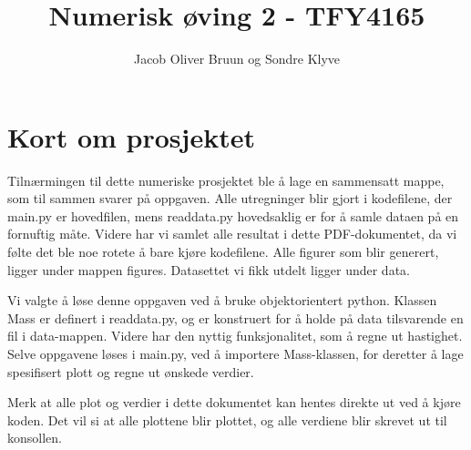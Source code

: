 \documentclass[a4paper, 11pt]{article}
\title{Numerisk øving 2 - TFY4165}
\author{Jacob Oliver Bruun og Sondre Klyve}
\begin{document}
\maketitle
\section*{Kort om prosjektet}
Tilnærmingen til dette numeriske prosjektet ble å lage en sammensatt mappe, som til sammen svarer på oppgaven. Alle utregninger blir gjort i kodefilene, der main.py er hovedfilen, mens read\textunderscore data.py hovedsaklig er for å samle dataen på en fornuftig måte. Videre har vi samlet alle resultat i dette PDF-dokumentet, da vi følte det ble noe rotete å bare kjøre kodefilene. Alle figurer som blir generert, ligger under mappen figures. Datasettet vi fikk utdelt ligger under data.

Vi valgte å løse denne oppgaven ved å bruke objektorientert python. Klassen Mass er definert i read\textunderscore data.py, og er konstruert for å holde på data tilsvarende en fil i data-mappen. Videre har den nyttig funksjonalitet, som å regne ut hastighet. Selve oppgavene løses i main.py, ved å importere Mass-klassen, for deretter å lage spesifisert plott og regne ut ønskede verdier.

Merk at alle plot og verdier i dette dokumentet kan hentes direkte ut ved å kjøre koden. Det vil si at alle plottene blir plottet, og alle verdiene blir skrevet ut til konsollen.
\end{document}
